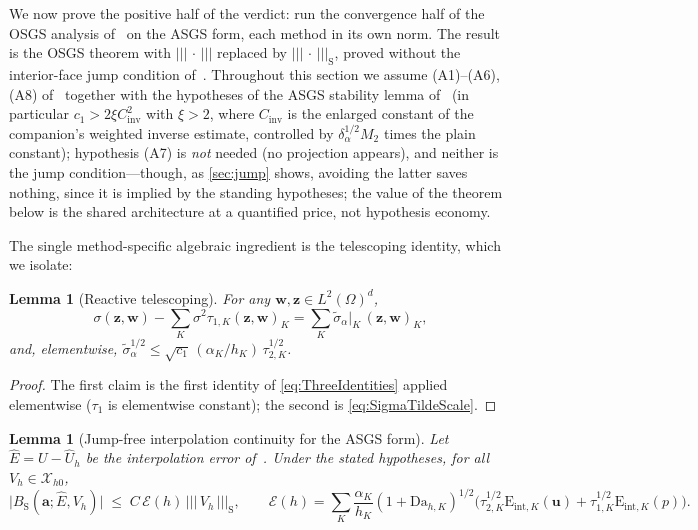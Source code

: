 \documentclass[11pt]{article}
\newtheorem{lemma}[theorem]{Lemma}
\theoremstyle{remark}
\newcommand{\bu}{\boldsymbol{u}}
\newcommand{\bw}{\boldsymbol{w}}
\newcommand{\ba}{\boldsymbol{a}}
\newcommand{\bz}{\boldsymbol{z}}
\newcommand{\tnorm}[1]{\lvert\!\lvert\!\lvert\, #1 \,\rvert\!\rvert\!\rvert}
\newcommand{\Eint}[2]{\mathrm{E}_{\mathrm{int},#1}(#2)}
\newcommand{\Dah}{\mathrm{Da}_{h,K}}
\newcommand{\Xhz}{\mathcal{X}_{h0}}
\newcommand{\st}{\widetilde{\sigma}_\alpha}
\newcommand{\Bs}{B_{\mathrm{S}}}
\newcommand{\EF}{\mathcal{E}}
\begin{document}
We now prove the positive half of the verdict: run the convergence half of the
OSGS analysis of~\cite{OSGSnote} on the ASGS form, each method in its own norm.
The result is the OSGS theorem with $\tnorm{\cdot}$ replaced by
$\tnorm{\cdot}_{\mathrm{S}}$, proved without the interior-face jump condition
of~\cite{companion}. Throughout this section we assume (A1)--(A6), (A8)
of~\cite{OSGSnote} together with the hypotheses of the ASGS stability lemma
of~\cite{companion} (in particular $c_1 > 2\xi C_{\mathrm{inv}}^2$ with $\xi > 2$,
where $C_{\mathrm{inv}}$ is the enlarged constant of the companion's weighted
inverse estimate, controlled by $\delta_\alpha^{1/2}M_2$ times the plain constant);
hypothesis (A7) is \emph{not} needed (no projection appears), and neither is the
jump condition---though, as \cref{sec:jump} shows, avoiding the latter saves
nothing, since it is implied by the standing hypotheses; the value of the theorem
below is the shared architecture at a quantified price, not hypothesis economy.

The single method-specific algebraic ingredient is the telescoping identity, which
we isolate:

\begin{lemma}[Reactive telescoping]
\label{lem:telescope}
For any $\bw, \bz \in L^2(\Omega)^d$,
\begin{equation}
  \label{eq:Telescope}
  \sigma(\bz, \bw) - \sum_K \sigma^2\tau_{1,K}(\bz,\bw)_K
  = \sum_K \st\big|_K\, (\bz, \bw)_K ,
\end{equation}
and, elementwise, $\st^{1/2} \le \sqrt{c_1}\,(\alpha_K/h_K)\,\tau_{2,K}^{1/2}$.
\end{lemma}

\begin{proof}
The first claim is the first identity of \cref{eq:ThreeIdentities} applied
elementwise ($\tau_1$ is elementwise constant); the second is
\cref{eq:SigmaTildeScale}.
\end{proof}

\begin{lemma}[Jump-free interpolation continuity for the ASGS form]
\label{lem:asgsinterp}
Let $\hat E = U - \hat U_h$ be the interpolation error of~\cite[\S 6.2]{OSGSnote}.
Under the stated hypotheses, for all $V_h \in \Xhz$,
\begin{equation}
  \label{eq:ASGSInterpBound}
  \bigl| \Bs(\ba; \hat E, V_h) \bigr|
  \;\le\; C\,\EF(h)\,\tnorm{V_h}_{\mathrm{S}},
  \qquad
  \EF(h) = \sum_K \frac{\alpha_K}{h_K}(1+\Dah)^{1/2}
  \bigl( \tau_{2,K}^{1/2}\Eint{K}{\bu} + \tau_{1,K}^{1/2}\Eint{K}{p} \bigr).
\end{equation}
\end{lemma}
\end{document}
